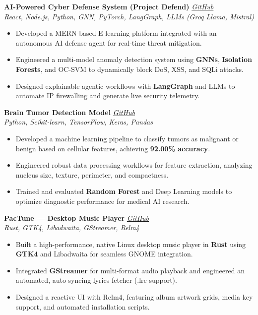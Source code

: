 \documentclass[letterpaper,10pt]{article}
\begin{document}
\noindent
\textbf{AI-Powered Cyber Defense System (Project Defend)}
\hfill \href{https://github.com/codemonkx/Server-Defence-System}{\textit{GitHub}}\\[-2pt]
\textit{\small React, Node.js, Python, GNN, PyTorch, LangGraph, LLMs (Groq Llama, Mistral)}
\begin{itemize}[leftmargin=*, noitemsep, topsep=1pt]
    \item Developed a MERN-based E-learning platform integrated with an autonomous AI defense agent for real-time threat mitigation.
    \item Engineered a multi-model anomaly detection system using \textbf{GNNs}, \textbf{Isolation Forests}, and OC-SVM to dynamically block DoS, XSS, and SQLi attacks.
    \item Designed explainable agentic workflows with \textbf{LangGraph} and LLMs to automate IP firewalling and generate live security telemetry.
\end{itemize}

\vspace{2pt}

\noindent
\textbf{Brain Tumor Detection Model}
\hfill \href{https://github.com/codemonkx/Brain-Tumor-prediction}{\textit{GitHub}}\\[-2pt]
\textit{\small Python, Scikit-learn, TensorFlow, Keras, Pandas}
\begin{itemize}[leftmargin=*, noitemsep, topsep=1pt]
    \item Developed a machine learning pipeline to classify tumors as malignant or benign based on cellular features, achieving \textbf{92.00\% accuracy}.
    \item Engineered robust data processing workflows for feature extraction, analyzing nucleus size, texture, perimeter, and compactness.
    \item Trained and evaluated \textbf{Random Forest} and Deep Learning models to optimize diagnostic performance for medical AI research.
\end{itemize}

\vspace{2pt}

\noindent
\textbf{PacTune — Desktop Music Player}
\hfill \href{https://github.com/codemonkx/PacTune}{\textit{GitHub}}\\[-2pt]
\textit{\small Rust, GTK4, Libadwaita, GStreamer, Relm4}
\begin{itemize}[leftmargin=*, noitemsep, topsep=1pt]
    \item Built a high-performance, native Linux desktop music player in \textbf{Rust} using \textbf{GTK4} and Libadwaita for seamless GNOME integration.
    \item Integrated \textbf{GStreamer} for multi-format audio playback and engineered an automated, auto-syncing lyrics fetcher (.lrc support).
    \item Designed a reactive UI with Relm4, featuring album artwork grids, media key support, and automated installation scripts.
\end{itemize}
\end{document}

